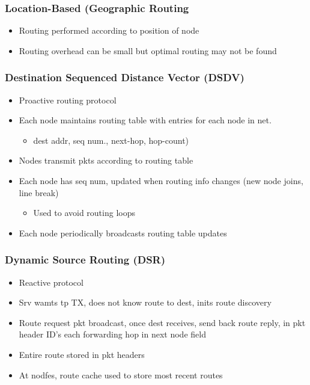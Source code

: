 \documentclass[a4paper]{article}
\begin{document}
\subsubsection{Location-Based (Geographic Routing}
\begin{itemize}
	\item Routing performed according to position of node
	\item Routing overhead can be small but optimal routing may not be found
\end{itemize}
\subsubsection{Destination Sequenced Distance Vector (DSDV)}
\begin{itemize}
	\item Proactive routing protocol
	\item Each node maintains routing table with entries for each node in
		net.
	\begin{itemize}
		\item dest addr, seq num., next-hop, hop-count)
	\end{itemize}
	\item Nodes transmit pkts according to routing table
	\item Each node has seq num, updated when routing info changes (new node
		joins, line break)
	\begin{itemize}
		\item Used to avoid routing loops
	\end{itemize}
	\item Each node periodically broadcasts routing table updates
\end{itemize}
\subsubsection{Dynamic Source Routing (DSR)}
\begin{itemize}
	\item Reactive protocol
	\item Srv wamts tp TX, does not know route to dest, inits route
		discovery
	\item Route request pkt broadcast, once dest receives, send back route
		reply, in pkt header ID's each forwarding hop in next node field
	\item Entire route stored in pkt headers
	\item At nodfes, route cache used to store most recent routes
\end{itemize}
\end{document}
